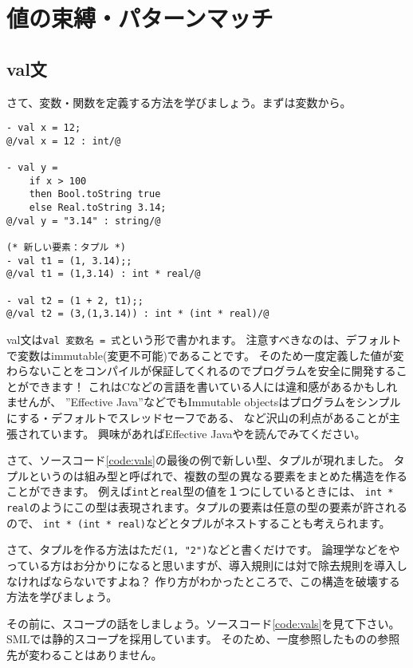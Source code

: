 \documentclass[11pt,a4paper]{article}
\begin{document}
\section{値の束縛・パターンマッチ}
\subsection{val文}
さて、変数・関数を定義する方法を学びましょう。まずは変数から。
\begin{lstlisting}[caption={val文}, label={code:vals}]
- val x = 12;
@/val x = 12 : int/@

- val y =
    if x > 100
    then Bool.toString true
    else Real.toString 3.14;
@/val y = "3.14" : string/@

(* 新しい要素：タプル *)
- val t1 = (1, 3.14);;
@/val t1 = (1,3.14) : int * real/@

- val t2 = (1 + 2, t1);;
@/val t2 = (3,(1,3.14)) : int * (int * real)/@
\end{lstlisting}

val文は\lstinline{val 変数名 = 式}という形で書かれます。
注意すべきなのは、デフォルトで変数はimmutable(変更不可能)であることです。
そのため一度定義した値が変わらないことをコンパイルが保証してくれるのでプログラムを安全に開発することができます！
これはCなどの言語を書いている人には違和感があるかもしれませんが、
''Effective Java''などでもImmutable objectsはプログラムをシンプルにする・デフォルトでスレッドセーフである、
など沢山の利点があることが主張されています。
興味があればEffective Javaや\cite{objects-should-be-immutable}を読んでみてください。

さて、ソースコード\ref{code:vals}の最後の例で新しい型、タプルが現れました。
タプルというのは組み型と呼ばれで、複数の型の異なる要素をまとめた構造を作ることができます。
例えば\lstinline{int}と\lstinline{real}型の値を１つにしているときには、
\lstinline{int * real}のようにこの型は表現されます。タプルの要素は任意の型の要素が許されるので、
\lstinline{int * (int * real)}などとタプルがネストすることも考えられます。

さて、タプルを作る方法はただ\lstinline{(1, "2")}などと書くだけです。
論理学などをやっている方はお分かりになると思いますが、導入規則には対で除去規則を導入しなければならないですよね？
作り方がわかったところで、この構造を破壊する方法を学びましょう。

その前に、スコープの話をしましょう。ソースコード\ref{code:vals}を見て下さい。
SMLでは静的スコープを採用しています。
そのため、一度参照したものの参照先が変わることはありません。
\end{document}
